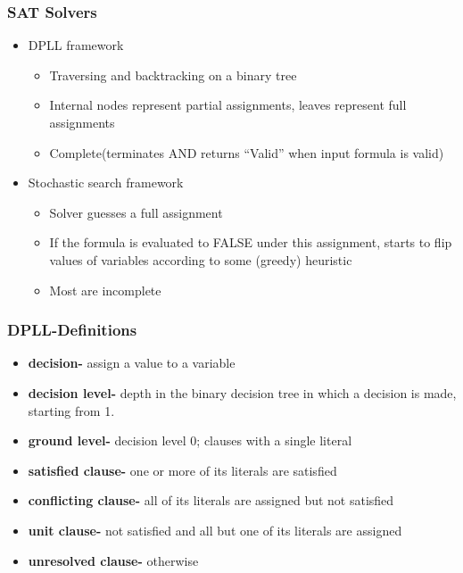 \documentclass{beamer}
\begin{document}
\begin{frame}

 \frametitle{SAT Solvers}
 
 \begin{itemize}
 
  \item  DPLL framework
 
    \begin{itemize}
 
    \item  Traversing and backtracking on a binary tree
    \item Internal nodes represent partial assignments, leaves represent full assignments
    \item Complete(terminates AND returns ``Valid'' when input formula is valid)
 
   \end{itemize}
   
  \item Stochastic search framework
  
    \begin{itemize}
 
    \item  Solver guesses a full assignment
    \item If the formula is evaluated to FALSE under this assignment, starts to flip values of variables according to some (greedy) heuristic
    \item Most are incomplete
 
   \end{itemize}
 
 \end{itemize}
 
\end{frame}

\begin{frame}

 \frametitle{DPLL-Definitions}
 
 \begin{itemize}
 
  \item  \textbf{decision-} assign a value to a variable
 \item  \textbf{decision level-} depth in the binary decision tree in which a decision is made, starting from 1.
  \item  \textbf{ground level-} decision level 0;  clauses with a single literal
   \item  \textbf{satisfied clause-} one or more of its literals are satisfied
   \item  \textbf{conflicting clause-} all of its literals are assigned but not satisfied
   \item  \textbf{unit clause-} not satisfied and all but one of its literals are assigned
   \item  \textbf{unresolved clause-} otherwise
   
 
 
 \end{itemize}
 
\end{frame}
\end{document}
